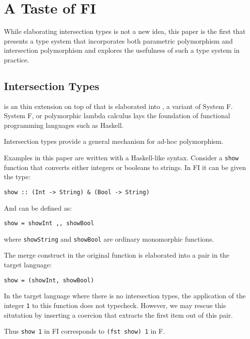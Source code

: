 \section{A Taste of FI}


While elaborating intersection types is not a new idea, this paper is the first
that presents a type system that incorporates both parametric polymorphism and
intersection polymorphism and explores the usefulness of such a type system in
practice.

\subsection{Intersection Types}

\FI is an thin extension on top of \F that is elaborated into \Fend, a variant
of System F. System F, or polymorphic lambda calculus lays the foundation of
functional programming languages such as Haskell.

Intersection types provide a general mechanism for ad-hoc polymorphism.

Examples in this paper are written with a Haskell-like syntax. Consider a
\texttt{show} function that converts either integers or booleans to strings. In
FI it can be given the type:

\begin{verbatim}
show :: (Int -> String) & (Bool -> String)
\end{verbatim}

And can be defined as:

\begin{verbatim}
show = showInt ,, showBool
\end{verbatim}

where \texttt{showString} and \texttt{showBool} are ordinary monomorphic
functions.

The merge construct in the original function is elaborated into a pair in the
target language:

\begin{verbatim}
show = (showInt, showBool)
\end{verbatim}

In the target language where there is no intersection types, the application of
the integer \texttt{1} to this function does not typecheck. However, we may
rescue this situtation by inserting a coercion that extracts the first item out
of this pair.

Thus \texttt{show 1} in FI corresponds to \texttt{(fst show) 1} in F.

